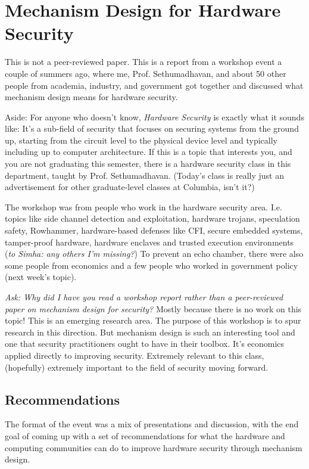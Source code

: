 \documentclass[11pt]{article}
\begin{document}
\section{Mechanism Design for Hardware Security}

This is not a peer-reviewed paper. This is a report from a workshop event a couple of summers ago, where me, Prof. Sethumadhavan, and about 50 other people from academia, industry, and government got together and discussed what mechanism design means for hardware security. 

Aside: For anyone who doesn't know, {\it Hardware Security} is exactly what it sounds like: It's a sub-field of security that focuses on securing systems from the ground up, starting from the circuit level to the physical device level and typically including up to computer architecture. 
If this is a topic that interests you, and you are not graduating this semester, there is a hardware security class in this department, taught by Prof. Sethumadhavan. 
(Today's class is really just an advertisement for other graduate-level classes at Columbia, isn't it?)

The workshop was from people who work in the hardware security area. I.e. topics like side channel detection and exploitation, hardware trojans, speculation safety, Rowhammer, hardware-based defenses like CFI, secure embedded systems, tamper-proof hardware, hardware enclaves and trusted execution environments ({\it to Simha: any others I'm missing?})
To prevent an echo chamber, there were also some people from economics and a few people who worked in government policy (next week's topic).

{\it Ask: Why did I have you read a workshop report rather than a peer-reviewed paper on mechanism design for security?} Mostly because there is no work on this topic! This is an emerging research area. The purpose of this workshop is to spur research in this direction. But mechanism design is such an interesting tool and one that security practitioners ought to have in their toolbox. It's economics applied directly to improving security. Extremely relevant to this class, (hopefully) extremely important to the field of security moving forward.

\subsection{Recommendations}

The format of the event was a mix of presentations and discussion, with the end goal of coming up with a set of recommendations for what the hardware and computing communities can do to improve hardware security through mechanism design. 
\end{document}
